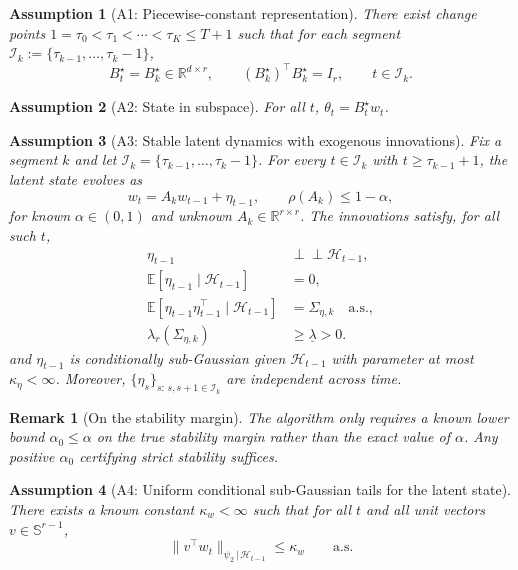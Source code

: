 \documentclass[12pt]{article}
\newcommand{\R}{\mathbb{R}}
\newcommand{\E}{\mathbb{E}}
\newcommand{\cH}{\mathcal{H}}
\newcommand{\cI}{\mathcal{I}}
\newtheorem{assumption}{Assumption}
\newtheorem{remark}{Remark}
\theoremstyle{plain}
\theoremstyle{definition}
\begin{document}
\begin{assumption}[A1: Piecewise-constant representation]
\label{assum:piecewise}
There exist change points $1 = \tau_0 < \tau_1 < \cdots < \tau_K \le T+1$ such that for each segment $\cI_k := \{\tau_{k-1}, \dots, \tau_k - 1\}$,
\[
B_t^\star = B_k^\star \in \R^{d \times r},
\qquad
(B_k^\star)^\top B_k^\star = I_r,
\qquad
t \in \cI_k.
\]
\end{assumption}

\begin{assumption}[A2: State in subspace]
\label{assum:state_subspace}
For all $t$, $\theta_t = B_t^\star w_t$.
\end{assumption}

\begin{assumption}[A3: Stable latent dynamics with exogenous innovations]
\label{assum:latent_dynamics}
Fix a segment $k$ and let $\cI_k = \{\tau_{k-1}, \dots, \tau_k - 1\}$. For every $t \in \cI_k$ with $t \ge \tau_{k-1} + 1$, the latent state evolves as
\[
w_t = A_k w_{t-1} + \eta_{t-1},
\qquad
\rho(A_k) \le 1 - \alpha,
\]
for known $\alpha \in (0,1)$ and unknown $A_k \in \R^{r \times r}$. The innovations satisfy, for all such $t$,
\[
\begin{aligned}
\eta_{t-1} &\perp\!\!\!\perp \cH_{t-1},\\
\E[\eta_{t-1} \mid \cH_{t-1}] &= 0,\\
\E[\eta_{t-1}\eta_{t-1}^\top \mid \cH_{t-1}] &= \Sigma_{\eta,k} \quad \text{a.s.},\\
\lambda_r(\Sigma_{\eta,k}) &\ge \underline{\lambda} > 0.
\end{aligned}
\]
and $\eta_{t-1}$ is conditionally sub-Gaussian given $\cH_{t-1}$ with parameter at most $\kappa_\eta < \infty$. Moreover, $\{\eta_s\}_{s:\, s, s+1 \in \cI_k}$ are independent across time.
\end{assumption}

\begin{remark}[On the stability margin]
The algorithm only requires a known lower bound $\alpha_0 \le \alpha$ on the true stability margin rather than the exact value of $\alpha$. Any positive $\alpha_0$ certifying strict stability suffices.
\end{remark}

\begin{assumption}[A4: Uniform conditional sub-Gaussian tails for the latent state]
\label{assum:subgaussian_state}
There exists a known constant $\kappa_w < \infty$ such that for all $t$ and all unit vectors $v \in \mathbb{S}^{r-1}$,
\[
\|v^\top w_t\|_{\psi_2 \,|\, \cH_{t-1}} \le \kappa_w \qquad \text{a.s.}
\]
\end{assumption}
\end{document}
